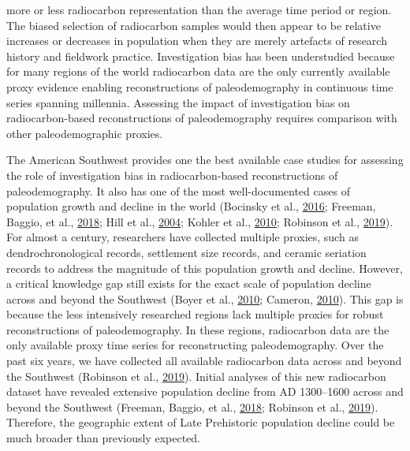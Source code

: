 \documentclass[
]{article}
\begin{document}
more or less radiocarbon representation than the average time period or region. The biased selection of radiocarbon samples would then appear to be relative increases or decreases in population when they are merely artefacts of research history and fieldwork practice. Investigation bias has been understudied because for many regions of the world radiocarbon data are the only currently available proxy evidence enabling reconstructions of paleodemography in continuous time series spanning millennia. Assessing the impact of investigation bias on radiocarbon-based reconstructions of paleodemography requires comparison with other paleodemographic proxies.

The American Southwest provides one the best available case studies for assessing the role of investigation bias in radiocarbon-based reconstructions of paleodemography. It also has one of the most well-documented cases of population growth and decline in the world (Bocinsky et al., \protect\hyperlink{ref-Bocinsky2016}{2016}; Freeman, Baggio, et al., \protect\hyperlink{ref-Freeman2018PNAS}{2018}; Hill et al., \protect\hyperlink{ref-Hill2004}{2004}; Kohler et al., \protect\hyperlink{ref-Kohler2010b}{2010}; Robinson et al., \protect\hyperlink{ref-Robinson2019}{2019}). For almost a century, researchers have collected multiple proxies, such as dendrochronological records, settlement size records, and ceramic seriation records to address the magnitude of this population growth and decline. However, a critical knowledge gap still exists for the exact scale of population decline across and beyond the Southwest (Boyer et al., \protect\hyperlink{ref-Boyer2010}{2010}; Cameron, \protect\hyperlink{ref-Cameron2010}{2010}). This gap is because the less intensively researched regions lack multiple proxies for robust reconstructions of paleodemography. In these regions, radiocarbon data are the only available proxy time series for reconstructing paleodemography. Over the past six years, we have collected all available radiocarbon data across and beyond the Southwest (Robinson et al., \protect\hyperlink{ref-Robinson2019}{2019}). Initial analyses of this new radiocarbon dataset have revealed extensive population decline from AD 1300--1600 across and beyond the Southwest (Freeman, Baggio, et al., \protect\hyperlink{ref-Freeman2018PNAS}{2018}; Robinson et al., \protect\hyperlink{ref-Robinson2019}{2019}). Therefore, the geographic extent of Late Prehistoric population decline could be much broader than previously expected.
\end{document}
